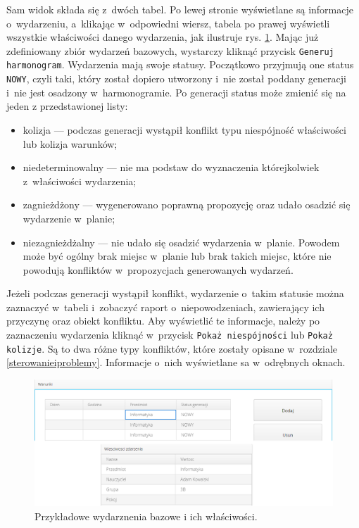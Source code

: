 \documentclass[a4paper]{book}
\begin{document}
{Sam widok składa się z~dwóch tabel. Po lewej stronie wyświetlane są informacje o~wydarzeniu, a~klikając w~odpowiedni wiersz, tabela po prawej wyświetli wszystkie właściwości danego wydarzenia, jak ilustruje rys. \ref{id:fig:wydBazowe2}. Mając już zdefiniowany zbiór wydarzeń bazowych, wystarczy kliknąć przycisk \lstinline|Generuj harmonogram|. Wydarzenia mają swoje statusy. Początkowo przyjmują one status \lstinline|NOWY|, czyli taki, który został dopiero utworzony i~nie został poddany generacji i~nie jest osadzony w~harmonogramie. Po generacji status może zmienić się na jeden z przedstawionej listy:
\begin{itemize}
	\item kolizja --- podczas generacji wystąpił konflikt typu niespójność właściwości lub kolizja warunków;
	\item niedeterminowalny --- nie ma podstaw do wyznaczenia którejkolwiek z~właściwości wydarzenia;
	\item zagnieżdżony --- wygenerowano poprawną propozycję oraz udało osadzić się wydarzenie w~planie;
	\item niezagnieżdżalny --- nie udało się osadzić wydarzenia w~planie. Powodem może być ogólny brak miejsc w~planie lub brak takich miejsc, które nie powodują konfliktów w~propozycjach generowanych wydarzeń.
\end{itemize}
Jeżeli podczas generacji wystąpił konflikt, wydarzenie o~takim statusie można zaznaczyć w~tabeli i~zobaczyć raport o~niepowodzeniach, zawierający ich przyczynę oraz obiekt konfliktu. Aby wyświetlić te informacje, należy po zaznaczeniu wydarzenia kliknąć w~przycisk \lstinline|Pokaż niespójności| lub \lstinline|Pokaż kolizje|. Są to dwa różne typy konfliktów, które zostały opisane w~rozdziale \ref{sterowanieiproblemy}. Informacje o~nich wyświetlane sa w~odrębnych oknach.
\begin{figure}
	\centering
	\includegraphics[width=1.0\textwidth]{./img/wydBazowe2.png}
	\caption{Przykładowe wydarznenia bazowe i ich właściwości.}
	\label{id:fig:wydBazowe2}
\end{figure}




}
\end{document}
